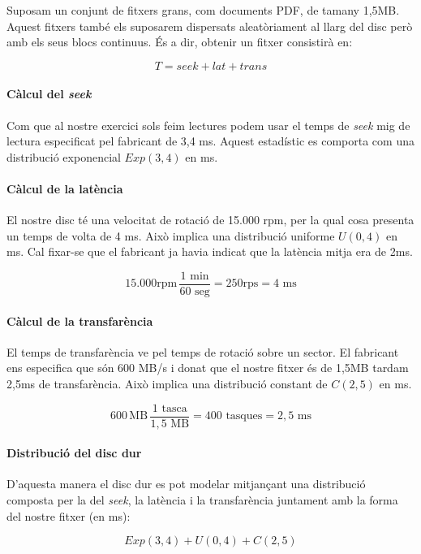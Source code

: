 Suposam un conjunt de fitxers grans, com documents PDF, de tamany 1,5MB. Aquest
fitxers també els suposarem dispersats aleatòriament al llarg del disc però amb
els seus blocs continuus. És a dir, obtenir un fitxer consistirà en:

\[ T = seek + lat + trans \]

\paragraph{Càlcul del \emph{seek}}

Com que al nostre exercici sols feim lectures podem usar el temps de
\emph{seek} mig de lectura especificat pel fabricant de 3,4 ms. Aquest
estadístic es comporta com una distribució exponencial $Exp(3,4)$ en ms.

\paragraph{Càlcul de la latència}

El nostre disc té una velocitat de rotació de 15.000 rpm, per la qual cosa
presenta un temps de volta de 4 ms. Això implica una distribució uniforme $U(0,
4)$ en ms. Cal fixar-se que el fabricant ja havia indicat que la latència mitja
era de 2ms.

\[ 15.000 \text{rpm} \, \frac{1 \text{ min}}{60 \text{ seg}} = 250 \text{rps}
= 4 \text{ ms}\]


\paragraph{Càlcul de la transfarència}

El temps de transfarència ve pel temps de rotació sobre un sector. El fabricant
ens especifica que són 600 MB/s i donat que el nostre fitxer és de 1,5MB tardam
2,5ms de transfarència. Això implica una distribució constant de $C(2,5)$ en
ms.

\[ 600 \, \text{MB} \, \frac{1 \text{ tasca}}{1,5 \text{ MB}}
       = 400 \text{ tasques} = 2,5 \text{ ms}\]

\paragraph{Distribució del disc dur}

D'aquesta manera el disc dur es pot modelar mitjançant una distribució composta
per la del \emph{seek}, la latència i la transfarència juntament amb la forma
del nostre fitxer (en ms):

\[ Exp(3,4) + U(0, 4) + C(2,5) \]
